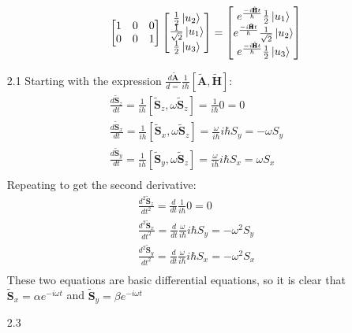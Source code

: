 \documentclass[12pt]{article}
\newcommand{\der}[2]{\frac{d #1}{d #2}}
\newcommand{\OP}[1]{\tilde{\pmb{\text{#1}}}}
\begin{document}
\begin{enumerate}
\begin{enumerate}
\begin{gather*}
\begin{bmatrix}
                    1 & 0 & 0 \\
                    0 & 0 & 1
                \end{bmatrix}
                \begin{bmatrix}
                    \frac{1}{2}\ket{u_2}        \\
                    \frac{1}{\sqrt{2}}\ket{u_1} \\
                    \frac{1}{2}\ket{u_3}
                \end{bmatrix}
                =
                \begin{bmatrix}
                    e^{\frac{-i\OP{H}t}{\hbar}}\frac{1}{2}\ket{u_1}        \\
                    e^{\frac{-i\OP{H}t}{\hbar}}\frac{1}{\sqrt{2}}\ket{u_2} \\
                    e^{\frac{-i\OP{H}t}{\hbar}}\frac{1}{2}\ket{u_3}
                \end{bmatrix}
            \end{gather*}
        \end{enumerate}
        \item[2.1]
        Starting with the expression $\der{\OP{A}}=\frac{1}{i\hbar}\left[\OP{A},\OP{H}\right]$:
        \begin{gather*}
            \der{\OP{S}_z}{t}=\frac{1}{ih}\left[\OP{S}_z,\omega \OP{S}_z\right]=\frac{1}{i\hbar}0=0\\
            \der{\OP{S}_x}{t}=\frac{1}{ih}\left[\OP{S}_x,\omega \OP{S}_z\right]=\frac{\omega}{i\hbar}i\hbar S_y=-\omega S_y\\
            \der{\OP{S}_y}{t}=\frac{1}{ih}\left[\OP{S}_y,\omega \OP{S}_z\right]=\frac{\omega}{i\hbar}i\hbar S_x=\omega S_x\\
        \end{gather*}
        Repeating to get the second derivative:
        \begin{gather*}
            \der{^2\OP{S}_z}{t^2}=\der{}{t}\frac{1}{i\hbar}0=0\\
            \der{^2\OP{S}_x}{t^2}=\der{}{t}\frac{\omega}{i\hbar}i\hbar S_y=-\omega^2 S_y\\
            \der{^2\OP{S}_y}{t^2}=\der{}{t}\frac{\omega}{i\hbar}i\hbar S_x=-\omega^2 S_x\\
        \end{gather*}
        These two equations are basic differential equations, so it is clear that $\OP{S}_x=\alpha e^{-i\omega t}$ and $\OP{S}_y=\beta e^{-i\omega t}$
        \item[2.3]

\end{enumerate}
\end{document}
